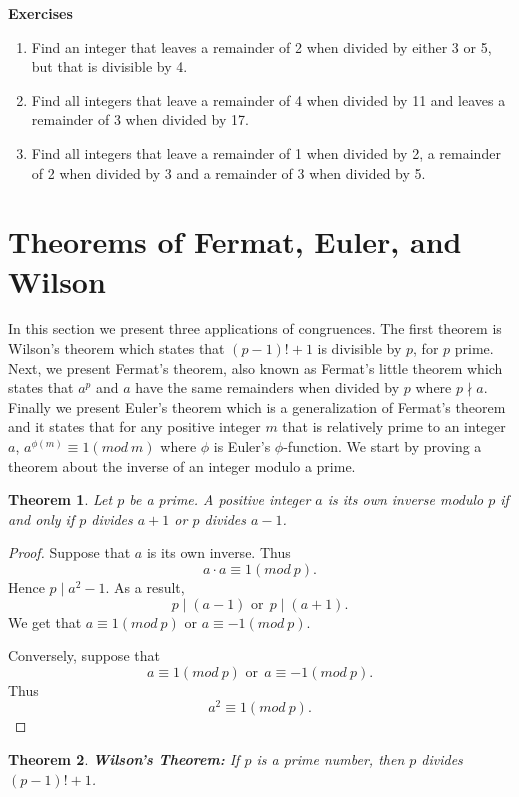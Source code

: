 \documentclass[12pt,letterpaper]{book}
\newtheorem{theorem}{Theorem}
\begin{document}
\textbf{Exercises}
\begin{enumerate}
\item{Find an integer that leaves a remainder of 2 when divided by
either 3 or 5, but that is divisible by 4.}\item{Find all integers
that leave a remainder of 4 when divided by 11 and leaves a
remainder of 3 when divided by 17.}\item{Find all integers that
leave a remainder of 1 when divided by 2, a remainder of 2 when
divided by 3 and a remainder of 3 when divided by 5. }
\end{enumerate}

\newpage

\section{Theorems of Fermat, Euler, and Wilson}
In this section we present three applications of congruences. The
first theorem is Wilson's theorem which states that $(p-1)!+1$ is
divisible by $p$, for $p$ prime.  Next, we present Fermat's theorem,
also known as Fermat's little theorem which states that $a^p$ and
$a$ have the same remainders when divided by $p$ where $p\nmid a$.
Finally we present Euler's theorem which is a generalization of
Fermat's theorem and it states that for any positive integer $m$
that is relatively prime to an integer $a$, $a^{\phi(m)}\equiv 1(mod
\ m)$ where $\phi$ is Euler's $\phi$-function.  We start by proving
a theorem about the inverse of an integer modulo a prime.

\begin{theorem}\label{InverseThm1}
Let $p$ be a prime.  A positive integer $a$ is its own inverse
modulo $p$ if and only if $p$ divides $a+1$ or $p$ divides $a-1$.
\end{theorem}

\begin{proof}
Suppose that $a$ is its own inverse.  Thus
\begin{equation*}
a\cdot a\equiv 1(mod \ p).
\end{equation*}
Hence $p\mid a^2-1$.  As a result,
\begin{equation*}
p\mid (a-1) \mbox{ or} \ \  p\mid (a+1).
\end{equation*}
We get that $a\equiv 1(mod\ p)$ or $a\equiv -1 (mod \ p)$.
\par Conversely, suppose that
\begin{equation*}
a\equiv 1(mod\ p) \mbox{ or} \ \  a\equiv -1 (mod \ p).
\end{equation*}
Thus
\begin{equation*}
a^2\equiv 1(mod \ p).
\end{equation*}
\end{proof}
\begin{theorem}\textbf{Wilson's Theorem:}
If $p$ is a prime number, then $p$ divides\\ $(p-1)!+1$.
\end{theorem}
\end{document}
